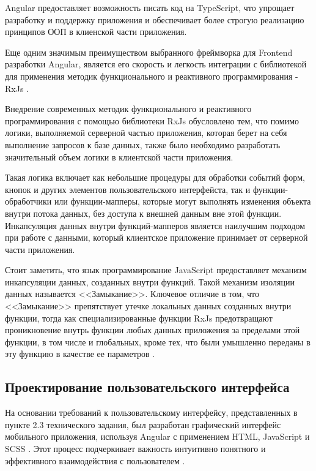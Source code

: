 Angular предоставляет возможность писать код на TypeScript, что упрощает разработку и поддержку приложения и обеспечивает более строгую реализацию принципов ООП в клиенской части приложения.

Еще одним значимым преимуществом выбранного фреймворка для Frontend разработки Angular, является его скорость и легкость интеграции с библиотекой для применения методик функционального и реактивного программирования -\- RxJs \cite{rxjs}.

Внедрение современных методик функционального и реактивного программирования с помощью библиотеки RxJs обусловлено тем, что помимо логики, выполняемой серверной частью приложения, которая берет на себя выполнение запросов к базе данных, также было необходимо разработать значительный объем логики в клиентской части приложения.

Такая логика включает как небольшие процедуры для обработки событий форм, кнопок и других элементов пользовательского интерфейста, так и функции-обработчики или функции-мапперы, которые могут выполнять изменения объекта внутри потока данных, без доступа к внешней данным вне этой функции. Инкапсуляция данных внутри функций-мапперов является наилучшим подходом при работе с данными, который клиентское приложение принимает от серверной части приложения.

Стоит заметить, что язык программирование JavaScript предоставляет механизм инкапсуляции данных, созданных внутри функций. Такой механизм изоляции данных называется <<Замыкание>>. Ключевое отличие в том, что <<Замыкание>> препятствует утечке локальных данных созданных внутри функции, тогда как специализированные функции RxJs предотвращают проникновение внутрь функции любых данных приложения за пределами этой функции, в том числе и глобальных, кроме тех, что были умышленно переданы в эту функцию в качестве ее параметров \cite{rxjs}.

\subsection{Проектирование пользовательского интерфейса}

На основании требований к пользовательскому интерфейсу, представленных в пункте 2.3 технического задания, был разработан графический интерфейс мобильного приложения, используя Angular с применением HTML, JavaScript и SCSS \cite{cssspecs}. Этот процесс подчеркивает важность интуитивно понятного и эффективного взаимодействия с пользователем \cite{kumskova}.

